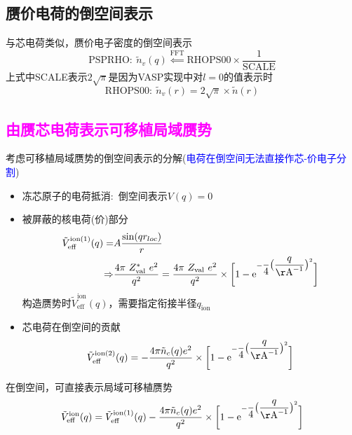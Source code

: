 \subsection{赝价电荷的倒空间表示}
与芯电荷类似，赝价电子密度的倒空间表示
\begin{displaymath}
	\mathrm{PSPRHO}:~\tilde{n}_v(q) \stackrel{\mathrm{FFT}}{\Longleftarrow}\boxed{\mathrm{RHOPS00}}\times\dfrac1{\mathrm{SCALE}}
\end{displaymath}
上式中\textrm{SCALE}表示$2\sqrt{\pi}$是因为\textrm{VASP}实现中对$l=0$的值表示时
\begin{displaymath}
	\mathrm{RHOPS00}:~\tilde{n}_v(r) = 2\sqrt{\pi}\times\tilde{n}(r)
\end{displaymath}

\subsection{\textcolor{magenta}{由赝芯电荷表示可移植局域赝势}}
考虑可移植局域赝势的倒空间表示的分解(\textcolor{blue}{电荷在倒空间无法直接作芯-价电子分割})
\begin{itemize}
	\item 冻芯原子的电荷抵消:~倒空间表示$V(q)=0$
	\item 被屏蔽的核电荷(价)部分
\begin{equation}
	\begin{aligned}
		\tilde{V}_{\mathrm{eff}}^{\mathrm{ion}(1)}(q) =& A\dfrac{\sin(qr_{loc})}r\\
		\Rightarrow & \dfrac{4\pi~Z_{\mathrm{val}}^{\ast}~e^2}{q^2} = \dfrac{4\pi~Z_{\mathrm{val}}~e^2}{q^2}\times\bigg[1-\mathrm{e}^{-\dfrac{}4\big(\dfrac{q}{\mathrm{\AA}^{-1}}\big)^2}\bigg] 
	\end{aligned}
	\label{eq:POT_G_core-EFF}
\end{equation}
构造赝势时$\tilde{V}_{\mathrm{eff}}^{\mathrm{ion}}(q)$，需要指定衔接半径$q_{\mathrm{ion}}$
	\item 芯电荷在倒空间的贡献
		\begin{equation}
			\tilde{V}_{\mathrm{eff}}^{\mathrm{ion}(2)}(q) = -\dfrac{4\pi\tilde{n}_c(q)e^2}{q^2}\times\bigg[1-\mathrm{e}^{-\dfrac{}4\big(\dfrac{q}{\mathrm{\AA}^{-1}}\big)^2}\bigg] 
			\label{eq:POT_G_core}
		\end{equation}
\end{itemize}
在倒空间，可直接表示局域可移植赝势
\begin{displaymath}
	\tilde{V}_{\mathrm{eff}}^{\mathrm{ion}}(q) = \tilde{V}_{\mathrm{eff}}^{\mathrm{ion}(1)}(q) - \dfrac{4\pi\tilde{n}_c(q)e^2}{q^2}\times\bigg[1-\mathrm{e}^{-\dfrac{}4\big(\dfrac{q}{\mathrm{\AA}^{-1}}\big)^2}\bigg] 
\end{displaymath}

